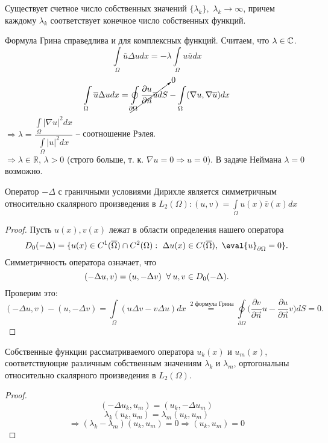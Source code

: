 \begin{statement}
Существует счетное число собственных значений $\{\lambda_k\}, \, \, \lambda_k \to \infty$, причем каждому $\lambda_k$ соответствует конечное число собственных функций.
\end{statement} 
Формула Грина справедлива и для комплексных функций. Считаем, что $\lambda \in \mathbb{C}$.
$$
\int\limits_{\Omega} \overline{u} \Delta u dx = - \lambda \int\limits_{\Omega} u \overline{u} dx$$
$$
\int\limits_{\Omega} \overline{u} \Delta u dx = \cancelto{0}{\oint\limits_{\partial \Omega} \frac{\partial u}{\partial \vec{n}} \overline{u} dS }- \int\limits_{\Omega} (\nabla u, \nabla \overline{u}) dx$$
$\Rightarrow \lambda = \dfrac{\int\limits_{\Omega}|\nabla u|^2 dx}{\int\limits_{\Omega}|u|^2 dx}$ -- соотношение Рэлея. \\
$\Rightarrow \lambda \in \mathbb{R}, \, \lambda >0 $ (строго больше, т. к. $\nabla u = 0 \Rightarrow u =0$). В задаче Неймана $\lambda = 0$ возможно.\\
\begin{statement} Оператор $-\Delta$ с граничными условиями Дирихле является симметричным относительно скалярного произведения в $L_2(\Omega): (u,v) = \int\limits_{\Omega} u(x) \overline{v}(x)dx $ 
\end{statement}
\begin{proof}
Пусть $u(x), v(x)$ лежат в области  определения нашего оператора $$D_0(-\Delta) = \{u(x) \in C^1(\overline{\Omega}) \cap C^2(\Omega): \ \Delta u(x) \in C(\overline{\Omega}), \ \eval{u}_{\partial \Omega} = 0 \}.$$
Симметричность оператора означает, что $$(-\Delta u,v)=(u, -\Delta v) \;\;\forall\: u,v \in D_0(-\Delta).$$ Проверим это: $$ (-\Delta u,v) - (u, -\Delta v) = \int\limits_{\Omega} (u \Delta v- v \Delta u)dx \stackrel{\text{ 2 формула Грина}}{=} \oint \limits_{\partial \Omega} \bigg( \frac{\partial v}{\partial \vec{n}}u - \frac{\partial u}{\partial \vec{n}}v \bigg) dS =0.$$
\end{proof}
\begin{statement} Собственные функции рассматриваемого оператора $u_k(x)$ и $u_m(x)$, соответствующие различным собственным значениям $\lambda_k$ и $\lambda_m$, ортогональны относительно скалярного произведения в $L_2(\Omega)$.
\end{statement}
\begin{proof}
$$(-\Delta u_k, u_m) = (u_k, -\Delta u_m)$$ $$\lambda_k (u_k, u_m)=  \lambda_m (u_k, u_m)$$ $$\Rightarrow (\lambda_k - \lambda_m) (u_k, u_m) = 0 \Rightarrow (u_k, u_m) = 0 $$
\end{proof}
 
 